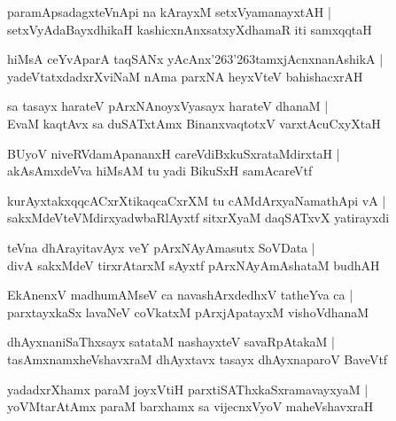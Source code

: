 \documentclass[twoside,12pt,openright]{book}
\def\S{\char'263}
\newcounter{shloka}[chapter]
\begin{document}
\begin{shloka}
paramApsadagxteVnApi na kArayxM setxVyamanayxtAH |\\
setxVyAdaBayxdhikaH kashicxnAnxsatxyXdhamaR iti samxqqtaH 
\end{shloka}

\begin{shloka}
hiMsA ceYvAparA taqSANx yAcAnx\S\S tamxjAcnxnanAshikA |\\
yadeVtatxdadxrXviNaM nAma parxNA heyxVteV bahishacxrAH
\end{shloka}

\begin{shloka}
sa tasayx harateV pArxNAnoyxVyasayx harateV dhanaM |\\
EvaM kaqtAvx sa duSATxtAmx BinanxvaqtotxV varxtAcuCxyXtaH 
\end{shloka}

\begin{shloka}
BUyoV niveRVdamApananxH careVdiBxkuSxrataMdirxtaH |\\
akAsAmxdeVva hiMsAM tu yadi BikuSxH samAcareVtf 
\end{shloka}

\begin{shloka}
kurAyxtakxqqcACxrXtikaqcaCxrXM tu cAMdArxyaNamathApi vA |\\
sakxMdeVteVMdirxyadwbaRlAyxtf sitxrXyaM daqSATxvX yatirayxdi
\end{shloka}

\begin{shloka}
teVna dhArayitavAyx veY pArxNAyAmasutx SoVData |\\
divA sakxMdeV tirxrAtarxM sAyxtf pArxNAyAmAshataM budhAH 
\end{shloka}

\begin{shloka}
EkAnenxV madhumAMseV ca navashArxdedhxV tatheYva ca |\\
parxtayxkaSx lavaNeV coVkatxM pArxjApatayxM vishoVdhanaM 
\end{shloka}

\begin{shloka}
dhAyxnaniSaThxsayx satataM nashayxteV savaRpAtakaM |\\
tasAmxnamxheVshavxraM dhAyxtavx tasayx dhAyxnaparoV BaveVtf 
\end{shloka}

\begin{shloka}
yadadxrXhamx paraM joyxVtiH parxtiSAThxkaSxramavayxyaM |\\
yoVMtarAtAmx paraM barxhamx sa vijecnxVyoV maheVshavxraH 
\end{shloka}
\end{document}
